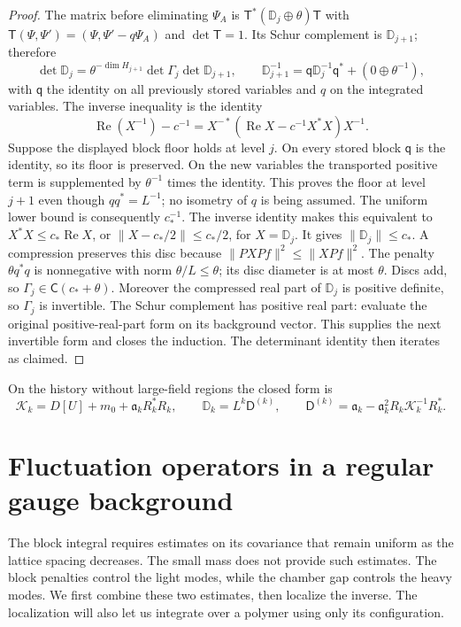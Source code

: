 \documentclass[11pt,letterpaper,reqno]{amsart}
\theoremstyle{definition}
\theoremstyle{remark}
\begin{document}
\begin{proof}
The matrix before eliminating $\Psi_A$ is
$\mathsf T^*(\mathbb D_j\oplus\theta)\mathsf T$ with
$\mathsf T(\Psi,\Psi')=(\Psi,\Psi'-q\Psi_A)$ and
$\det\mathsf T=1$.  Its Schur complement is $\mathbb D_{j+1}$;
therefore
\[
 \det\mathbb D_j=\theta^{-\dim H_{j+1}}
                         \det\Gamma_j\det\mathbb D_{j+1},
 \qquad
 \mathbb D_{j+1}^{-1}=\mathsf q\mathbb D_j^{-1}\mathsf q^*
                                      +(0\oplus\theta^{-1}),
\]
with $\mathsf q$ the identity on all previously stored variables
and $q$ on the integrated variables.  The inverse inequality is the identity
\[
 \operatorname{Re}(X^{-1})-c^{-1}
  =X^{-*}(\operatorname{Re}X-c^{-1}X^*X)X^{-1}.
\]
Suppose the displayed block floor holds at level $j$.
On every stored block $\mathsf q$ is the identity, so its
floor is preserved.  On the new variables the transported
positive term is supplemented by $\theta^{-1}$ times the
identity.  This proves the floor at level $j+1$ even though
$qq^*=L^{-1}$; no isometry of $q$ is being assumed.
The uniform lower bound is consequently $c_*^{-1}$.
The inverse identity makes this equivalent to
$X^*X\le c_*\operatorname{Re}X$, or
$\|X-c_*/2\|\le c_*/2$, for $X=\mathbb D_j$.
It gives $\|\mathbb D_j\|\le c_*$.
A compression preserves this disc because
$\|PXPf\|^2\le\|XPf\|^2$.
The penalty $\theta q^*q$ is nonnegative with norm
$\theta/L\le\theta$; its disc diameter is at most
$\theta$.  Discs add, so
$\Gamma_j\in\mathsf C(c_*+\theta)$.
Moreover the compressed real part of $\mathbb D_j$
is positive definite, so $\Gamma_j$ is invertible.
The Schur complement has positive real part: evaluate the
original positive-real-part form on its background vector.
This supplies the next invertible form and closes the
induction.  The determinant identity then iterates as claimed.
\end{proof}

On the history without large-field regions the closed form is
\[
 \mathcal K_k=D[U]+m_0+\mathfrak a_kR_k^*R_k,
 \qquad
 \mathbb D_k=L^k\mathsf D^{(k)},\qquad
 \mathsf D^{(k)}=\mathfrak a_k-
       \mathfrak a_k^2R_k\mathcal K_k^{-1}R_k^*.
\]

\section{Fluctuation operators in a regular gauge background}

The block integral requires estimates on its covariance that remain
uniform as the lattice spacing decreases.  The small mass does not
provide such estimates.  The block penalties control the light modes,
while the chamber gap controls the heavy modes.  We first combine these
two estimates, then localize the inverse.  The localization will also
let us integrate over a polymer using only its configuration.
\end{document}
